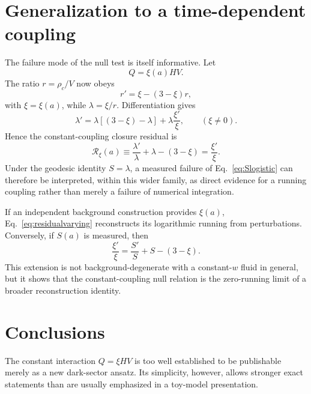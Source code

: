 \documentclass[11pt]{article}
\theoremstyle{remark}
\begin{document}
\section{Generalization to a time-dependent coupling}
\label{sec:varyingxi}

The failure mode of the null test is itself informative.  Let
\begin{equation}
    Q=\xi(a)HV.
    \label{eq:varyingQ}
\end{equation}
The ratio $r=\rho_c/V$ now obeys
\begin{equation}
    r'=\xi-(3-\xi)r,
    \label{eq:rvarying}
\end{equation}
with $\xi=\xi(a)$, while $\lambda=\xi/r$.  Differentiation gives
\begin{equation}
    \lambda'
    =\lambda\left[(3-\xi)-\lambda\right]
    +\lambda\frac{\xi'}{\xi},
    \qquad (\xi\neq0).
    \label{eq:lambdaVarying}
\end{equation}
Hence the constant-coupling closure residual is
\begin{equation}
    \mathcal R_\xi(a)
    \equiv
    \frac{\lambda'}{\lambda}+\lambda-(3-\xi)
    =\frac{\xi'}{\xi}.
    \label{eq:residualvarying}
\end{equation}
Under the geodesic identity $S=\lambda$, a measured failure of Eq.~\eqref{eq:Slogistic} can therefore be interpreted, within this wider family, as direct evidence for a running coupling rather than merely a failure of numerical integration.

If an independent background construction provides $\xi(a)$, Eq.~\eqref{eq:residualvarying} reconstructs its logarithmic running from perturbations.  Conversely, if $S(a)$ is measured, then
\begin{equation}
    \frac{\xi'}{\xi}
    =\frac{S'}{S}+S-(3-\xi).
    \label{eq:xirun}
\end{equation}
This extension is not background-degenerate with a constant-$w$ fluid in general, but it shows that the constant-coupling null relation is the zero-running limit of a broader reconstruction identity.

\section{Conclusions}
\label{sec:conclusion}

The constant interaction $Q=\xi HV$ is too well established to be publishable merely as a new dark-sector ansatz.  Its simplicity, however, allows stronger exact statements than are usually emphasized in a toy-model presentation.
\end{document}
